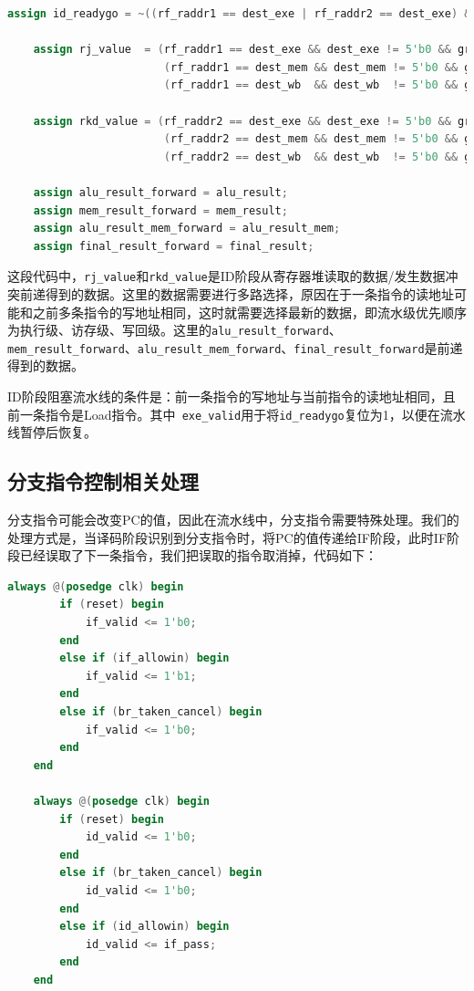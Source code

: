 \documentclass[UTF8]{report}
\begin{document}
\begin{lstlisting}[language=Verilog]
    assign id_readygo = ~((rf_raddr1 == dest_exe | rf_raddr2 == dest_exe) && ld_w_exe) | ~exe_valid;

    assign rj_value  = (rf_raddr1 == dest_exe && dest_exe != 5'b0 && gr_we_exe && !ld_w_exe) ? alu_result_forward :
                        (rf_raddr1 == dest_mem && dest_mem != 5'b0 && gr_we_mem) ? res_from_mem_mem ? mem_result_forward : alu_result_mem_forward :
                        (rf_raddr1 == dest_wb  && dest_wb  != 5'b0 && gr_we_wb ) ? final_result_forward : rf_rdata1;

    assign rkd_value = (rf_raddr2 == dest_exe && dest_exe != 5'b0 && gr_we_exe && !ld_w_exe) ? alu_result_forward :
                        (rf_raddr2 == dest_mem && dest_mem != 5'b0 && gr_we_mem) ? res_from_mem_mem ? mem_result_forward : alu_result_mem_forward :
                        (rf_raddr2 == dest_wb  && dest_wb  != 5'b0 && gr_we_wb ) ? final_result_forward : rf_rdata2;

    assign alu_result_forward = alu_result;
    assign mem_result_forward = mem_result;
    assign alu_result_mem_forward = alu_result_mem;
    assign final_result_forward = final_result;
\end{lstlisting}

这段代码中，\texttt{rj\_value}和\texttt{rkd\_value}是ID阶段从寄存器堆读取的数据/发生数据冲突前递得到的数据。这里的数据需要进行多路选择，原因在于一条指令的读地址可能和之前多条指令的写地址相同，这时就需要选择最新的数据，即流水级优先顺序为执行级、访存级、写回级。这里的\texttt{alu\_result\_forward}、\texttt{mem\_result\_forward}、\texttt{alu\_result\_mem\_forward}、\texttt{final\_result\_forward}是前递得到的数据。

ID阶段阻塞流水线的条件是：前一条指令的写地址与当前指令的读地址相同，且前一条指令是Load指令。其中\texttt{~exe_valid}用于将\texttt{id\_readygo}复位为1，以便在流水线暂停后恢复。

\subsection{分支指令控制相关处理}

分支指令可能会改变PC的值，因此在流水线中，分支指令需要特殊处理。我们的处理方式是，当译码阶段识别到分支指令时，将PC的值传递给IF阶段，此时IF阶段已经误取了下一条指令，我们把误取的指令取消掉，代码如下：

\begin{lstlisting}[language=Verilog]
    always @(posedge clk) begin
        if (reset) begin
            if_valid <= 1'b0;
        end
        else if (if_allowin) begin
            if_valid <= 1'b1;
        end
        else if (br_taken_cancel) begin
            if_valid <= 1'b0;
        end
    end

    always @(posedge clk) begin
        if (reset) begin
            id_valid <= 1'b0;
        end
        else if (br_taken_cancel) begin
            id_valid <= 1'b0;
        end
        else if (id_allowin) begin
            id_valid <= if_pass;
        end
    end
\end{lstlisting}
\end{document}
